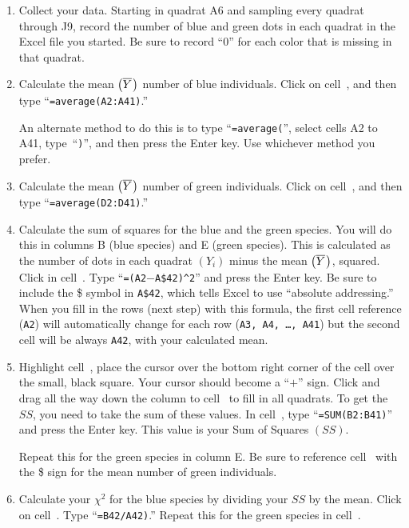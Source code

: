 \documentclass[12pt, hidelinks]{exam}
\newcommand\chisq{$\chi^2$}
\newcommand*\meanY{\overline{Y}\kern0.67pt}
\newcommand*\xcell[1]{cell~\liningnum{#1}}
\begin{document}
\begin{enumerate}

\item Collect your data. Starting in quadrat {\liningnum A6} and sampling every quadrat
through {\liningnum J9}, record the number of blue and green dots in each quadrat
in the Excel file you started. Be sure to record “0” for each
color that is missing in that quadrat.


\item Calculate the mean $\left( \meanY \right)$ number of blue individuals. Click on \xcell{A42}, and then type “\texttt{=average(A2:A41)}.”

 An alternate method to do this is to type “\texttt{=average(}”, select cells {\liningnum A2 to A41}, type~“\texttt{)}”, and then press the Enter key. Use whichever method you prefer.

\item Calculate the mean  $\left( \meanY \right)$ number of green individuals. Click on \xcell{D42}, and then type
“\texttt{=average(D2:D41)}.”

\item Calculate the sum of squares for the blue and the green species. You will do this in
columns B (blue species) and E (green species). This is calculated as the number of dots in each quadrat $\left( Y_i \right)$ minus the mean $\left( \meanY \right)$,
squared. Click in \xcell{B2}. Type “\texttt{=(A2$-$A\$42)\textasciicircum2}” and press the Enter key. 
Be sure to include the \$ symbol in \texttt{A\$42}, which tells Excel to use “absolute addressing.” When you fill in the rows (next step) with this formula, the first cell reference (\texttt{A2}) will automatically change for each row (\texttt{A3,\,A4,\,\dots,\,A41}) but the second cell will be always \texttt{A42}, with your calculated mean. 

\item Highlight \xcell{B2}, place the cursor over the bottom right corner of
the cell over the small, black square. Your cursor should become a “$+$”
sign. Click and drag all the way down the column to \xcell{B41} to fill
in all quadrats.  To get the $SS$, you need to take the sum of these
values. In \xcell{B42}, type “\texttt{=SUM(B2:B41)}” and press the Enter key. This value is your Sum of Squares $(SS)$.

Repeat this for the green species in column E. Be sure to reference \xcell{D42} with the \$ sign for the mean number of green individuals.

\item Calculate your \chisq{} for the blue species by dividing your $SS$ by the mean. Click on \xcell{C42}. Type “\texttt{=B42/A42)}.” Repeat this for the green species in \xcell{F42}.


\end{enumerate}
\end{document}
